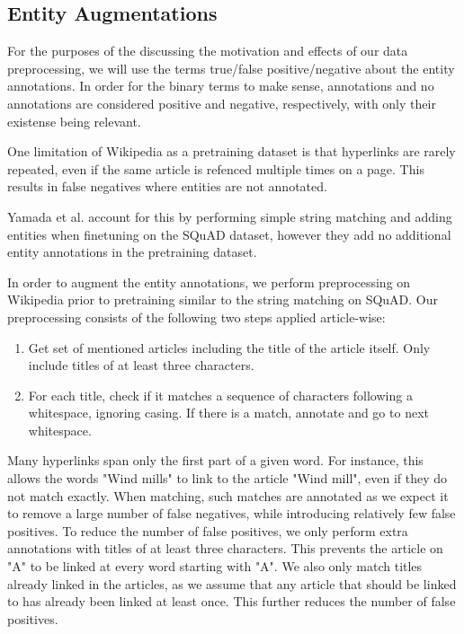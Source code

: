 \documentclass[main.tex]{subfiles}
\begin{document}
\subsection{Entity Augmentations}
\label{subsec:entaug}
For the purposes of the discussing the motivation and effects of our data preprocessing, we will use the terms true/false positive/negative about the entity annotations.
In order for the binary terms to make sense, annotations and no annotations are considered positive and negative, respectively, with only their existense being relevant.

One limitation of Wikipedia as a pretraining dataset is that hyperlinks are rarely repeated, even if the same article is refenced multiple times on a page.
This results in false negatives where entities are not annotated.

Yamada et al. account for this by performing simple string matching and adding entities when finetuning on the SQuAD dataset, however they add no additional entity annotations in the pretraining dataset. \cite{yamada2020luke}

In order to augment the entity annotations, we perform preprocessing on Wikipedia prior to pretraining similar to the string matching on SQuAD.
Our preprocessing consists of the following two steps applied article-wise:
\begin{enumerate}
    \item Get set of mentioned articles including the title of the article itself.
    Only include titles of at least three characters.
    \item For each title, check if it matches a sequence of characters following a whitespace, ignoring casing.
    If there is a match, annotate and go to next whitespace.
\end{enumerate}
Many hyperlinks span only the first part of a given word.
For instance, this allows the words "Wind mills" to link to the article "Wind mill", even if they do not match exactly.
When matching, such matches are annotated as we expect it to remove a large number of false negatives, while introducing relatively few false positives.
To reduce the number of false positives, we only perform extra annotations with titles of at least three characters.
This prevents the article on "A" to be linked at every word starting with "A".
We also only match titles already linked in the articles, as we assume that any article that should be linked to has already been linked at least once.
This further reduces the number of false positives.
\end{document}
